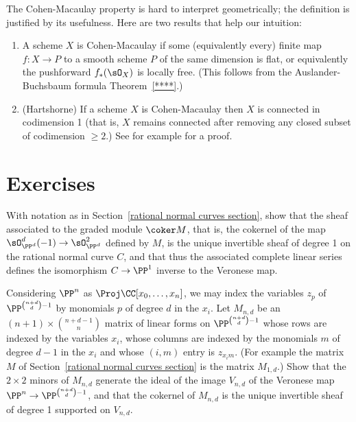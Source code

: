 \begin{fact}\label{meaning of ACM}
The Cohen-Macaulay property is hard to interpret geometrically; the definition is justified by its usefulness. Here are two results that help our intuition:
\begin{enumerate}
\item A scheme $X$ is Cohen-Macaulay if some (equivalently every) finite map $f: X\to P$ to a smooth scheme $P$
of the same dimension is flat, or equivalently the pushforward $f_*(\sO_X)$ is locally free. (This follows
from the Auslander-Buchsbaum formula Theorem~\ref{****}.)
\item (Hartshorne) If a scheme $X$ is Cohen-Macaulay then $X$ is connected in codimension 1 (that is, $X$ remains connected after removing any closed subset of codimension $\geq 2$.)
See for example \cite[Theorem 18.12]{Eisenbud1995} for a proof.
\end{enumerate}
 
\end{fact}


\section{Exercises}

\begin{exercise}\label{veronese inverse}
With notation as in Section~\ref{rational normal curves section}, show that the sheaf associated to the graded module $\coker M$,
that is, the cokernel of the map $\sO_{\PP^d}^d(-1) \to \sO_{\PP^d}^2$ defined by $M$, is the unique invertible sheaf of degree 1
on the rational normal curve $C$, and that thus the associated complete linear series defines the isomorphism $C\to \PP^1$ inverse
to the Veronese map.
\end{exercise}

\begin{exercise}\label{equations of Veroneses}
Considering $\PP^n$ as $\Proj \CC[x_0,\dots,x_n]$, we may index the variables $z_p$ of $\PP^{\binom{n+d}{d}-1}$ by  monomials $p$
of degree $d$ in the $x_i$. Let $M_{n,d}$ be an $(n+1)\times \binom{n+d-1}{n}$ matrix of linear forms
on $\PP^{\binom{n+d}{d}-1}$ whose rows are indexed by the variables $x_i$, whose columns are indexed by the monomials $m$ of degree $d-1$ in the $x_i$ and
whose $(i,m)$ entry is $z_{x_im}$. (For example the matrix
$M$ of Section~\ref{rational normal curves section} is the matrix $M_{1,d}$.) Show that the $2\times 2$ minors of $M_{n,d}$ generate the ideal of the image $V_{n,d}$ of the Veronese map 
$\PP^n\to \PP^{\binom{n+d}{d}-1}$, and that the cokernel of $M_{n,d}$ is the unique invertible sheaf of degree 1 supported on $V_{n,d}$.
\end{exercise}

